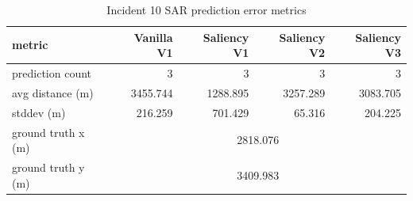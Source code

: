 \begin{table}[ht]
\centering
\caption{Incident 10 SAR prediction error metrics}
\label{tab:sar-incident-10}
\begin{tabular}{lrrrr}
\hline
metric & Vanilla V1 & Saliency V1 & Saliency V2 & Saliency V3 \\
\hline
prediction count & 3 & 3 & 3 & 3 \\
avg distance (m) & 3455.744 & 1288.895 & 3257.289 & 3083.705 \\
stddev (m) & 216.259 & 701.429 & 65.316 & 204.225 \\
ground truth x (m) & \multicolumn{4}{c}{2818.076} \\
ground truth y (m) & \multicolumn{4}{c}{3409.983} \\
\hline
\end{tabular}
\end{table}
